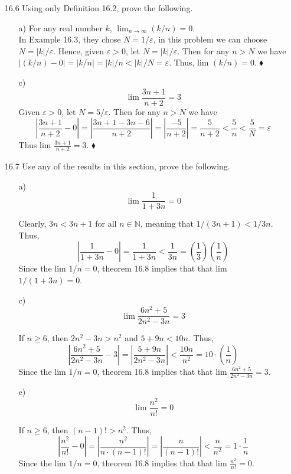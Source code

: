 \documentclass[12pt]{article}
\begin{document}
\begin{enumerate}
\begin{enumerate}
\item[16.6] Using only Definition 16.2, prove the following.
\begin{enumerate}
\item[a)] For any real number $k$, $\lim_{n \to \infty}(k/n) = 0$. \\
In Example 16.3, they chose $N = 1/\varepsilon$, in this problem we can choose $N = |k|/\varepsilon$. Hence, given $\varepsilon > 0$, let $N = |k|/\varepsilon$. Then for any $n > N$ we have
$|(k/n) - 0| = |k/n| = |k|/n < |k|/N = \varepsilon$. Thus, lim $(k/n) = 0$. $\blacklozenge$
\item[c)]
\[
\lim \frac{3n + 1}{n + 2} = 3
\]
Given $\varepsilon > 0$, let $N = 5/\varepsilon$. Then for any $n > N$ we have 
\[
\left| \frac{3n + 1}{n + 2} - 0 \right| = \left| \frac{3n + 1 - 3n - 6}{n + 2}\right|
= \left| \frac{-5}{n + 2} \right| = \frac{5}{n + 2} <  \frac{5}{n} < \frac{5}{N} = \varepsilon
\]
Thus lim $\frac{3n + 1}{n + 2} = 3$. $\blacklozenge$
\end{enumerate}

\item[16.7] Use any of the results in this section, prove the following.
\begin{enumerate}
\item[a)] 
\[
\lim \frac{1}{1 + 3n} = 0
\]

Clearly, $3n < 3n + 1$ for all $n \in \mathbb{N}$, meaning that $1/(3n + 1) < 1/3n$. Thus,
\[ 
\left| \frac{1}{1 + 3n} - 0 \right| = \frac{1}{1 + 3n} < \frac{1}{3n} = \left( \frac{1}{3} \right) 
\left( \frac{1}{n} \right)
\]
Since the lim $1/n = 0$, theorem 16.8 implies that that lim $1/(1 + 3n) = 0$.
\item[c)] 
\[
\lim \frac{6n^2 + 5}{2n^2 - 3n} = 3
\]

If $n \geq 6$, then $2n^2 - 3n > n^2$ and $5 + 9n < 10n$. Thus,
\[
\left| \frac{6n^2 + 5}{2n^2 - 3n} - 3 \right| = \left| \frac{5 + 9n}{2n^2 - 3n} \right| < 
\frac{10n}{n^2} = 10 \cdot \left( \frac{1}{n} \right) 
\]
Since the lim $1/n = 0$, theorem 16.8 implies that that lim $\frac{6n^2 + 5}{2n^2 - 3n} = 3$.

\item[e)] 
\[
\lim \frac{n^2}{n!} = 0
\]

If $n \geq 6$, then $(n - 1)! > n^2$. Thus, 
\[
\left| \frac{n^2}{n!} - 0 \right| = \left| \frac{n^2}{n \cdot (n - 1)!} \right| =
\left| \frac{n}{(n - 1)!} \right| < \frac{n}{n^2} = 1 \cdot \frac{1}{n}
\]
Since the lim $1/n = 0$, theorem 16.8 implies that that lim $\frac{n^2}{n!} = 0$.
\end{enumerate}


\end{enumerate}
\end{enumerate}
\end{document}
